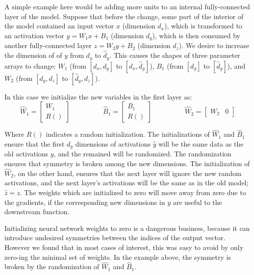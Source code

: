 \documentclass[ocean-paper.tex]{subfiles}
\begin{document}
A simple example here would be adding more units to an internal fully-connected layer of the model. Suppose that before the change, some part of the interior of the model contained an input vector $x$ (dimension $d_x$), which is transformed to an activation vector $y=W_1x+B_1$ (dimension $d_y$), which is then consumed by another fully-connected layer $z=W_2y+B_2$ (dimension $d_z$). We desire to increase the dimension of of $y$ from $d_y$ to $\hat{d}_y$. This causes the shapes of three parameter arrays to change: $W_1$ (from $[d_x, d_y]$ to $[d_x, \hat{d}_y]$), $B_1$ (from $[d_y]$ to $[\hat{d}_y]$), and $W_2$ (from $[d_y, d_z]$ to $[\hat{d}_y, d_z]$).

In this case we initialize the new variables in the first layer as:
\begin{equation}\label{eqn:surgery-example}
\hat{W}_1 = \left[
\begin{array}{c}
W_1 \\ R()
\end{array}
\right]
\hspace{2cm}
\hat{B}_1 = \left[
\begin{array}{c}
B_1 \\ R()
\end{array}
\right]
\hspace{2cm}
\hat{W}_2 = \left[
\begin{array}{cc}
W_2 & 0
\end{array}
\right]
\end{equation}

Where $R()$ indicates a random initialization. 
The initializations of $\hat{W}_1$ and $\hat{B}_1$ ensure that the first $d_y$ dimensions of activations $\hat{y}$ will be the same data as the old activations $y$, and the remained will be randomized. 
The randomization ensures that symmetry is broken among the new dimensions.
The initialization of $\hat{W}_2$, on the other hand, ensures that the next layer will ignore the new random activations, and the next layer's activations will be the same as in the old model; $\hat{z}=z$.
The weights which are initialized to zero will move away from zero due to the gradients, if the corresponding new dimensions in $y$ are useful to the downstream function.

Initializing neural network weights to zero is a dangerous business, because it can introduce undesired symmetries between the indices of the output vector. 
However we found that in most cases of interest, this was easy to avoid by only zero-ing the minimal set of weights. 
In the example above, the symmetry is broken by the randomization of $\hat{W}_1$ and $\hat{B}_1$.
\end{document}
